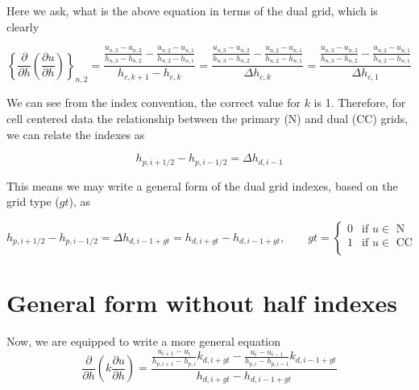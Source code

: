 \documentclass[11pt]{article}
\begin{document}
Here we ask, what is the above equation in terms of the dual grid, which is clearly

\begin{equation}
 \left\{\frac{\partial}{\partial h} \left( \frac{\partial u}{\partial h} \right) \right\}_{n,2}
 = \frac{ \frac{u_{n,3}-u_{n,2}}{h_{n,3}-h_{n,2}} -  \frac{u_{n,2}-u_{n,1}}{h_{n,2}-h_{n,1}} }{h_{c,k+1} - h_{c,k}}
 =
 \frac{ \frac{u_{n,3}-u_{n,2}}{h_{n,3}-h_{n,2}} -  \frac{u_{n,2}-u_{n,1}}{h_{n,2}-h_{n,1}} }{\Delta h_{c,k}}
 =
 \frac{ \frac{u_{n,3}-u_{n,2}}{h_{n,3}-h_{n,2}} -  \frac{u_{n,2}-u_{n,1}}{h_{n,2}-h_{n,1}} }{\Delta h_{c,1}}
\end{equation}

We can see from the index convention, the correct value for $k$ is 1. Therefore, for cell centered data the relationship between the primary (N) and dual (CC) grids, we can relate the indexes as

\begin{equation}
  h_{p,i+1/2} - h_{p,i-1/2} = \Delta h_{d,i-1}
\end{equation}


This means we may write a general form of the dual grid indexes, based on the grid type ($gt$), as

\begin{equation}
  h_{p,i+1/2} - h_{p,i-1/2} = \Delta h_{d,i-1+gt} = h_{d,i+gt} - h_{d,i-1+gt}
  , \qquad
 gt =
\begin{cases}
    0 & \text{if $u \in $ N} \\
    1 & \text{if $u \in $ CC} \\
 \end{cases}
\end{equation}



\section{General form without half indexes}
Now, we are equipped to write a more general equation
\begin{equation}
\frac{\partial}{\partial h} \left( k \frac{\partial u}{\partial h} \right)
 = \frac{\frac{u_{i+1}-u_{i}}{h_{p,i+1}-h_{p,i}} k_{d,i+gt} - \frac{u_{i}-u_{i-1}}{h_{p,i}-h_{p,i-1}} k_{d,i-1+gt}}{h_{d,i+gt} - h_{d,i-1+gt}}
\end{equation}
\end{document}
